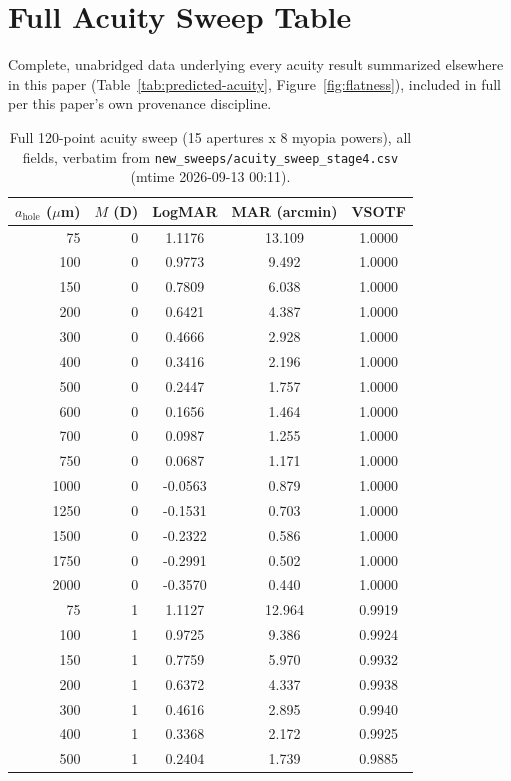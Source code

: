 \chapter{Full Acuity Sweep Table}
\label{ch:full-acuity-table}
Complete, unabridged data underlying every acuity result summarized elsewhere in this paper (Table~\ref{tab:predicted-acuity}, Figure~\ref{fig:flatness}), included in full per this paper's own provenance discipline.

\begin{longtable}{rrccc}
\caption{Full 120-point acuity sweep (15 apertures x 8 myopia powers), all fields, verbatim from \texttt{new\_sweeps/acuity\_sweep\_stage4.csv} (mtime 2026-09-13 00:11).}\label{tab:full-acuity-sweep}\\
\toprule
$a_{\mathrm{hole}}$ ($\mu$m) & $M$ (D) & LogMAR & MAR (arcmin) & VSOTF \\
\midrule
\endhead
75 & 0 & 1.1176 & 13.109 & 1.0000 \\
100 & 0 & 0.9773 & 9.492 & 1.0000 \\
150 & 0 & 0.7809 & 6.038 & 1.0000 \\
200 & 0 & 0.6421 & 4.387 & 1.0000 \\
300 & 0 & 0.4666 & 2.928 & 1.0000 \\
400 & 0 & 0.3416 & 2.196 & 1.0000 \\
500 & 0 & 0.2447 & 1.757 & 1.0000 \\
600 & 0 & 0.1656 & 1.464 & 1.0000 \\
700 & 0 & 0.0987 & 1.255 & 1.0000 \\
750 & 0 & 0.0687 & 1.171 & 1.0000 \\
1000 & 0 & -0.0563 & 0.879 & 1.0000 \\
1250 & 0 & -0.1531 & 0.703 & 1.0000 \\
1500 & 0 & -0.2322 & 0.586 & 1.0000 \\
1750 & 0 & -0.2991 & 0.502 & 1.0000 \\
2000 & 0 & -0.3570 & 0.440 & 1.0000 \\
75 & 1 & 1.1127 & 12.964 & 0.9919 \\
100 & 1 & 0.9725 & 9.386 & 0.9924 \\
150 & 1 & 0.7759 & 5.970 & 0.9932 \\
200 & 1 & 0.6372 & 4.337 & 0.9938 \\
300 & 1 & 0.4616 & 2.895 & 0.9940 \\
400 & 1 & 0.3368 & 2.172 & 0.9925 \\
500 & 1 & 0.2404 & 1.739 & 0.9885 \\

\end{longtable}
